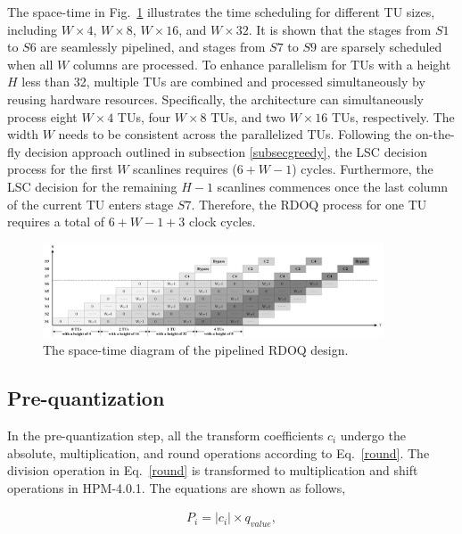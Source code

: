 \documentclass[lettersize,journal]{IEEEtran}
\begin{document}
The space-time in Fig.~\ref{timing diagram} illustrates the time scheduling for different TU sizes, including $W\times4$, $W\times8$, $W\times16$, and $W\times32$. It is shown that the stages from $S1$ to $S6$ are seamlessly pipelined, and stages from $S7$ to $S9$ are sparsely scheduled when all $W$ columns are processed. 
To enhance parallelism for TUs with a height $H$ less than 32, multiple TUs are combined and processed simultaneously by reusing hardware resources. Specifically, the architecture can simultaneously process eight $W\times4$ TUs, four $W\times8$ TUs, and two $W\times16$ TUs, respectively. The width $W$ needs to be consistent across the parallelized TUs. 
Following the on-the-fly decision approach outlined in subsection \ref{subsecgreedy}, the LSC decision process for the first $W$ scanlines requires ($6 + W - 1$) cycles. Furthermore, the LSC decision for the remaining $H-1$ scanlines commences once the last column of the current TU enters stage $S7$. Therefore, the RDOQ process for one TU requires a total of $6 + W - 1 + 3$ clock cycles. 

\par
\begin{figure}[htbp]
	\centering
	\centerline{\includegraphics[width=0.90\textwidth]{pic_pan/timing diagram.png}} 
	\caption{The space-time diagram of the pipelined RDOQ design.}
	\label{timing diagram} %
\end{figure}

\subsection{Pre-quantization}
In the pre-quantization step, all the transform coefficients $c_{i}$ undergo the absolute, multiplication, and round operations according to Eq.~\eqref{round}. The division operation in Eq.~\eqref{round} is transformed to multiplication and shift operations in HPM-4.0.1. The equations are shown as follows,

\begin{equation}\label{Qp}
	\begin{aligned}
		P_{i} = \lvert c_{i} \rvert \times q_{value},
	\end{aligned}
\end{equation}
\end{document}
